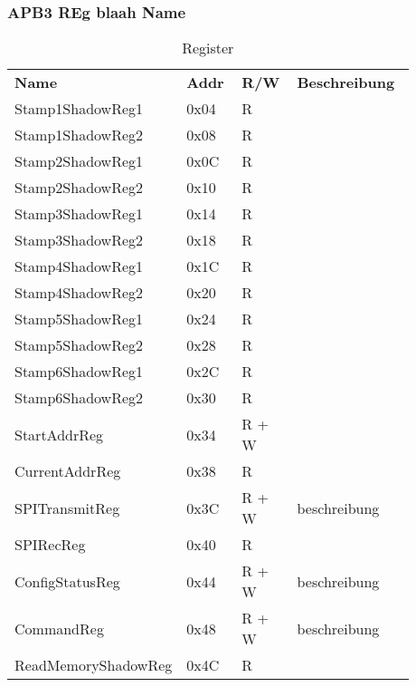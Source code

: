 
\subsubsection{APB3 REg blaah Name}
\begin{longtable} [htb] { |p{0.3\linewidth}|p{0.14\linewidth}|p{0.14\linewidth}|p{0.3\linewidth}| } \hline
	

	\caption{Register}
	\label{tab:table3}\\
	\hline
	\textbf{Name} & \textbf{Addr}& \textbf{R/W}&\textbf{Beschreibung}\\
	\hline
	Stamp1ShadowReg1&0x04&R&\\
	\hline
	Stamp1ShadowReg2&0x08&R&\\
	\hline
	Stamp2ShadowReg1&0x0C&R&\\
	\hline
	Stamp2ShadowReg2&0x10&R&\\
	\hline
	Stamp3ShadowReg1&0x14&R&\\
	\hline
	Stamp3ShadowReg2&0x18&R&\\
	\hline
	Stamp4ShadowReg1&0x1C&R&\\
	\hline
	Stamp4ShadowReg2&0x20&R&\\
	\hline
	Stamp5ShadowReg1&0x24&R&\\
	\hline
	Stamp5ShadowReg2&0x28&R&\\
	\hline
	Stamp6ShadowReg1&0x2C&R&\\
	\hline
	Stamp6ShadowReg2&0x30&R&\\
	\hline
	StartAddrReg&0x34&R + W&\\
	\hline
	CurrentAddrReg&0x38&R&\\
	\hline
	SPITransmitReg&0x3C&R + W&beschreibung\\
	\hline
	SPIRecReg&0x40&R&\\
	\hline
	ConfigStatusReg&0x44&R + W&beschreibung\\
	\hline
	CommandReg&0x48&R + W&beschreibung\\
	\hline
	ReadMemoryShadowReg&0x4C&R&\\
	\hline

	\end{longtable}
	